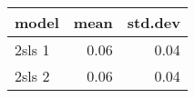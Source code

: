 \begin{tabular}{lrr}
  \hline
model & mean & std.dev \\ 
  \hline
2sls 1 & 0.06 & 0.04 \\ 
  2sls 2 & 0.06 & 0.04 \\ 
   \hline
\end{tabular}
